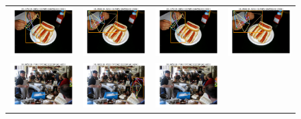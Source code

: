\documentclass[10pt,onecolumn,letterpaper]{article}
\begin{document}
\begin{figure}[h!]
{\begin{tabular}{cc|cc}
\includegraphics[width=.2\linewidth,height=.15\paperwidth,keepaspectratio]{./result/rmpe/scoring_errors/score_err_3_high_score.pdf} &
\includegraphics[width=.2\linewidth,height=.15\paperwidth,keepaspectratio]{./result/rmpe/scoring_errors/score_err_3_high_oks.pdf} &
\includegraphics[width=.2\linewidth,height=.15\paperwidth,keepaspectratio]{./result/rmpe/scoring_errors/score_err_3_high_score.pdf} &
\includegraphics[width=.2\linewidth,height=.15\paperwidth,keepaspectratio]{./result/rmpe/scoring_errors/score_err_3_high_oks.pdf}\\
\includegraphics[width=.2\linewidth,height=.15\paperwidth,keepaspectratio]{./result/rmpe/scoring_errors/score_err_4_high_score.pdf} &
\includegraphics[width=.2\linewidth,height=.15\paperwidth,keepaspectratio]{./result/rmpe/scoring_errors/score_err_4_high_oks.pdf} &
\includegraphics[width=.2\linewidth,height=.15\paperwidth,keepaspectratio]{./result/rmpe/scoring_errors/score_err_4_high_score.pdf} &

\end{tabular}}
\end{figure}
\end{document}
